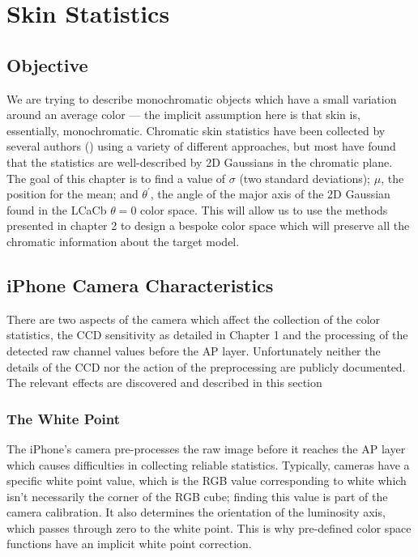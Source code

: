 
\chapter{Skin Statistics}\label{sec:ChapSkin}
\ifpdf
    \graphicspath{{Chapter3/Figs/Raster/}{Chapter3/Figs/PDF/}{Chapter3/Figs/}}
\else
    \graphicspath{{Chapter3/Figs/Vector/}{Chapter3/Figs/}}
\fi

\section{Objective}\label{sec:Objective}
We are trying to describe monochromatic objects which have a small variation around an average color --- the implicit assumption here is that skin is, essentially, monochromatic. Chromatic skin statistics have been collected by several authors (\cite{yang1998a,kollias1995,jedynak2003a,gomez2002a,Lee2002,Sigal2000a}) using a variety of different approaches, but most have found that the statistics are well-described by 2D Gaussians in the chromatic plane. The goal of this chapter is to find a value of $\sigma$ (two standard deviations); $\mu$, the position for the mean; and $\theta^\prime$, the angle of the major axis of the 2D Gaussian found in the LCaCb $\theta = 0$ color space. This will allow us to use the methods presented in chapter 2 to design a bespoke color space which will preserve all the chromatic information about the target model.

\section{iPhone Camera Characteristics} \label{sec:iPhoneCameraCharacteristics}
There are two aspects of the camera which affect the collection of the color statistics, the CCD sensitivity as detailed in Chapter 1 and the processing of the detected raw channel values before the AP layer. Unfortunately neither the details of the CCD nor the action of the preprocessing are publicly documented. The relevant effects are discovered and described in this section 

\subsection{The White Point}\label{sec:WhitePoint}
The iPhone's camera pre-processes the raw image before it reaches the AP layer which causes difficulties in collecting reliable statistics. Typically, cameras have a specific white point value, which is the RGB value corresponding to white which isn't necessarily the corner of the RGB cube; finding this value is part of the camera calibration. It also determines the orientation of the luminosity axis, which passes through zero to the white point. This is why pre-defined color space functions have an implicit white point correction. 

